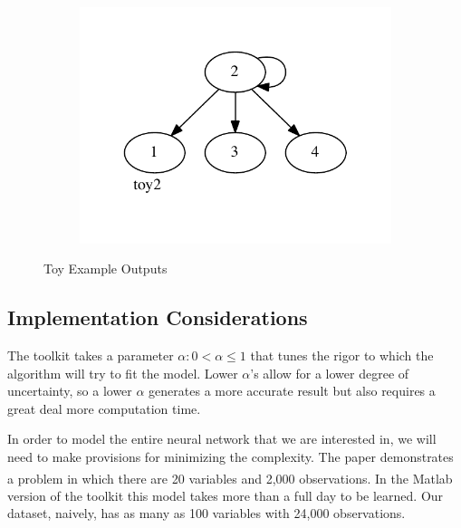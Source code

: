 \documentclass{article}
\begin{document}
\begin{figure}[h]
\begin{subfigure}{0.25\textwidth}
    \label{toy1}
  \end{subfigure}
  ~
  \begin{subfigure}{0.5\textwidth}
    \includegraphics[width=\textwidth]{toy2}
    \label{toy2}
  \end{subfigure}

  \caption{Toy Example Outputs}
  \label{toys}
\end{figure}

\subsection*{Implementation Considerations}

The toolkit takes a parameter $\alpha : 0 < \alpha \le 1$ that tunes the rigor 
to which the algorithm will try to fit the model. Lower $\alpha$'s allow for 
a lower degree of uncertainty, so a lower $\alpha$ generates a more accurate 
result but also requires a great deal more computation time. \par

In order to model the entire neural network that we are interested in, we will 
need to make provisions for minimizing the complexity. The 
paper\cite{globalmit} demonstrates a problem in which there are 20 variables 
and 2,000 observations. In the Matlab\textsuperscript{\textregistered} version 
of the toolkit this model takes more than a full day to be learned. Our 
dataset, naively, has as many as 100 variables with 24,000 observations. \par
\end{document}
